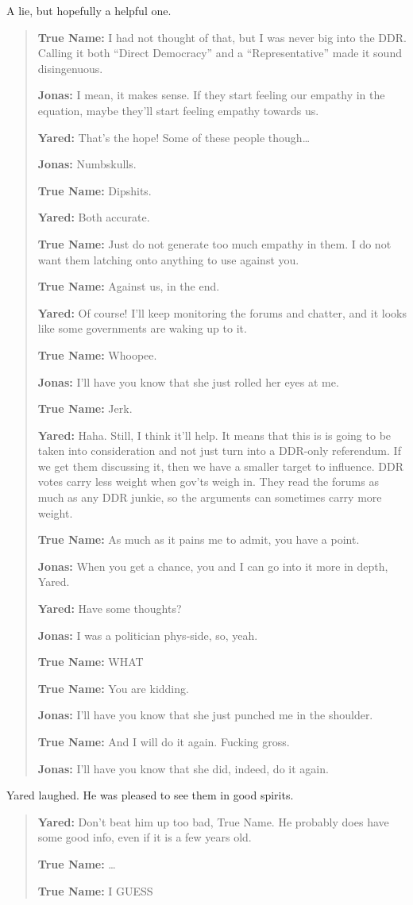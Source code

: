 \noindent A lie, but hopefully a helpful one.

\begin{quote}
\textbf{True Name:} I had not thought of that, but I was never big into the DDR. Calling it both ``Direct Democracy'' and a ``Representative'' made it sound disingenuous.

\textbf{Jonas:} I mean, it makes sense. If they start feeling our empathy in the equation, maybe they'll start feeling empathy towards us.

\textbf{Yared:} That's the hope! Some of these people though\ldots{}

\textbf{Jonas:} Numbskulls.

\textbf{True Name:} Dipshits.

\textbf{Yared:} Both accurate.

\textbf{True Name:} Just do not generate too much empathy in them. I do not want them latching onto anything to use against you.

\textbf{True Name:} Against us, in the end.

\textbf{Yared:} Of course! I'll keep monitoring the forums and chatter, and it looks like some governments are waking up to it.

\textbf{True Name:} Whoopee.

\textbf{Jonas:} I'll have you know that she just rolled her eyes at me.

\textbf{True Name:} Jerk.

\textbf{Yared:} Haha. Still, I think it'll help. It means that this is is going to be taken into consideration and not just turn into a DDR-only referendum. If we get them discussing it, then we have a smaller target to influence. DDR votes carry less weight when gov'ts weigh in. They read the forums as much as any DDR junkie, so the arguments can sometimes carry more weight.

\textbf{True Name:} As much as it pains me to admit, you have a point.

\textbf{Jonas:} When you get a chance, you and I can go into it more in depth, Yared.

\textbf{Yared:} Have some thoughts?

\textbf{Jonas:} I was a politician phys-side, so, yeah.

\textbf{True Name:} WHAT

\textbf{True Name:} You are kidding.

\textbf{Jonas:} I'll have you know that she just punched me in the shoulder.

\textbf{True Name:} And I will do it again. Fucking gross.

\textbf{Jonas:} I'll have you know that she did, indeed, do it again.
\end{quote}

\noindent Yared laughed. He was pleased to see them in good spirits.

\begin{quote}
\textbf{Yared:} Don't beat him up too bad, True Name. He probably does have some good info, even if it is a few years old.

\textbf{True Name:} \ldots{}

\textbf{True Name:} I GUESS
\end{quote}
